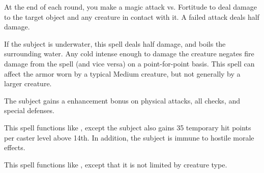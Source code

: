 \spellrng{\rngmed}
\begin{spelleffect}
    At the end of each round, you make a magic attack vs. Fortitude to deal damage to the target object and any creature in contact with it. A failed attack deals half damage.
\end{spelleffect}
\begin{spellnotes}
  If the subject is underwater, this spell deals half damage,  and boils the surrounding water. Any cold intense enough to damage the creature negates fire damage from the spell (and vice versa) on a point-for-point basis. This spell can affect the armor worn by a typical Medium creature, but not generally by a larger creature.
\end{spellnotes}

\spellrng{\rngclose}
\begin{spelleffect}
  The subject gains a  enhancement bonus on physical attacks, all checks, and special defenses. \spellbonusscalingdescription
\end{spelleffect}

\begin{spelleffect}
  This spell functions like , except the subject also gains 35 temporary hit points  per caster level above 14th. In addition, the subject is immune to hostile morale effects.
\end{spelleffect}

\begin{spelleffect}
  This spell functions like , except that it is not limited by creature type.
\end{spelleffect}

